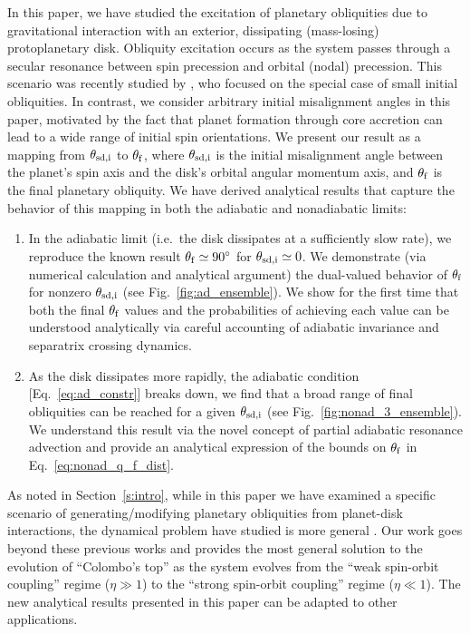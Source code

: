 \documentclass[twocolumn,twocolappendix]{aastex63}
\begin{document}
In this paper, we have studied the excitation of planetary obliquities due to
gravitational interaction with an exterior, dissipating (mass-losing)
protoplanetary disk. Obliquity excitation occurs as the system passes through a
secular resonance between spin precession and orbital (nodal) precession. This
scenario was recently studied by \citet{millholland_disk}, who focused on the
special case of small initial obliquities.  In contrast, we consider arbitrary
initial misalignment angles in this paper, motivated by the fact that planet
formation through core accretion can lead to a wide range of initial spin
orientations.  We present our result as a mapping from $\theta_{\rm sd, i}$ to
$\theta_{\rm f}$, where $\theta_{\rm sd, i}$ is the initial misalignment angle
between the planet's spin axis and the disk's orbital angular momentum axis, and
$\theta_{\rm f}$ is the final planetary obliquity. We have derived analytical
results that capture the behavior of this mapping in both the adiabatic and
nonadiabatic limits:
\begin{enumerate}
    \item In the adiabatic limit (i.e.\ the disk dissipates at a
        sufficiently slow rate), we reproduce the known result $\theta_{\rm f}
        \simeq 90^\circ$ for $\theta_{\rm sd, i} \simeq 0$. We demonstrate (via
        numerical calculation and analytical argument) the dual-valued behavior
        of $\theta_{\rm f}$ for nonzero $\theta_{\rm sd, i}$ (see
        Fig.~\ref{fig:ad_ensemble}). We \textcolor{Corr}{show for the first time
        that} both the final $\theta_{\rm f}$ values and the probabilities of
        achieving each value \textcolor{Corr}{can be understood analytically}
        via careful accounting of adiabatic invariance and separatrix crossing
        dynamics.

    \item As the disk dissipates more rapidly, the adiabatic condition
        [Eq.~\eqref{eq:ad_constr}] breaks down, we find that a broad range of
        final obliquities can be reached for a given $\theta_{\rm sd, i}$ (see
        Fig.~\ref{fig:nonad_3_ensemble}). We \textcolor{Corr}{understand this
        result via the novel concept of partial adiabatic resonance advection
        and} provide an analytical expression of the bounds on $\theta_{\rm f}$
        in Eq.~\eqref{eq:nonad_q_f_dist}.
\end{enumerate}

As noted in Section~\ref{s:intro}, while in this paper we have examined a
specific scenario of generating/modifying planetary obliquities from planet-disk
interactions, the dynamical problem have studied is more general
\citep{colombo1966,peale1969,peale1974possible,ward1975tidal,henrard1987}. Our
work goes beyond these previous works and provides the most general solution to
the evolution of ``Colombo's top'' as the system evolves from the ``weak
spin-orbit coupling'' regime ($\eta\gg 1$) to the ``strong spin-orbit coupling''
regime ($\eta\ll 1$).  The new analytical results presented in this paper can be
adapted to other applications.
\end{document}
